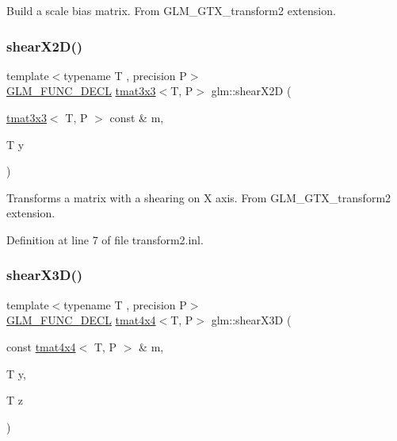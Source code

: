 Build a scale bias matrix. From G\+L\+M\+\_\+\+G\+T\+X\+\_\+transform2 extension. \mbox{\label{group__gtx__transform2_ga10f6c62d8f827c4cacedb71fd05e4ba2}} 
\subsubsection{\texorpdfstring{shearX2D()}{shearX2D()}}
{\footnotesize\ttfamily template$<$typename T , precision P$>$ \\
\mbox{\hyperlink{setup_8hpp_ab2d052de21a70539923e9bcbf6e83a51}{G\+L\+M\+\_\+\+F\+U\+N\+C\+\_\+\+D\+E\+CL}} \mbox{\hyperlink{structglm_1_1tmat3x3}{tmat3x3}}$<$T, P$>$ glm\+::shear\+X2D (\begin{DoxyParamCaption}\item[{\mbox{\hyperlink{structglm_1_1tmat3x3}{tmat3x3}}$<$ T, P $>$ const \&}]{m,  }\item[{T}]{y }\end{DoxyParamCaption})}

Transforms a matrix with a shearing on X axis. From G\+L\+M\+\_\+\+G\+T\+X\+\_\+transform2 extension. 

Definition at line 7 of file transform2.\+inl.

\mbox{\label{group__gtx__transform2_gae06ce274e4754f925d5d68440e89452e}} 
\subsubsection{\texorpdfstring{shearX3D()}{shearX3D()}}
{\footnotesize\ttfamily template$<$typename T , precision P$>$ \\
\mbox{\hyperlink{setup_8hpp_ab2d052de21a70539923e9bcbf6e83a51}{G\+L\+M\+\_\+\+F\+U\+N\+C\+\_\+\+D\+E\+CL}} \mbox{\hyperlink{structglm_1_1tmat4x4}{tmat4x4}}$<$T, P$>$ glm\+::shear\+X3D (\begin{DoxyParamCaption}\item[{const \mbox{\hyperlink{structglm_1_1tmat4x4}{tmat4x4}}$<$ T, P $>$ \&}]{m,  }\item[{T}]{y,  }\item[{T}]{z }\end{DoxyParamCaption})}

